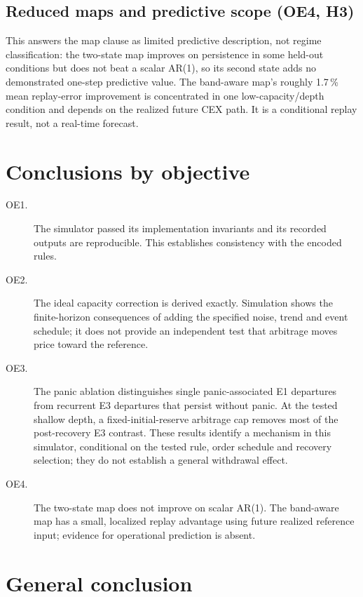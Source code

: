 \subsection{Reduced maps and predictive scope (OE4, H3)}

This answers the map clause as limited predictive description, not regime classification: the two-state map improves on persistence in some held-out conditions but does not beat a scalar AR(1), so its second state adds no demonstrated one-step predictive value. The band-aware map's roughly 1.7\,\% mean replay-error improvement is concentrated in one low-capacity/depth condition and depends on the realized future CEX path. It is a conditional replay result, not a real-time forecast.

\section{Conclusions by objective}

\begin{description}
  \item[OE1.] The simulator passed its implementation invariants and its recorded outputs are reproducible. This establishes consistency with the encoded rules.
  \item[OE2.] The ideal capacity correction is derived exactly. Simulation shows the finite-horizon consequences of adding the specified noise, trend and event schedule; it does not provide an independent test that arbitrage moves price toward the reference.
  \item[OE3.] The panic ablation distinguishes single panic-associated E1 departures from recurrent E3 departures that persist without panic. At the tested shallow depth, a fixed-initial-reserve arbitrage cap removes most of the post-recovery E3 contrast. These results identify a mechanism in this simulator, conditional on the tested rule, order schedule and recovery selection; they do not establish a general withdrawal effect.
  \item[OE4.] The two-state map does not improve on scalar AR(1). The band-aware map has a small, localized replay advantage using future realized reference input; evidence for operational prediction is absent.
\end{description}

\section{General conclusion}

